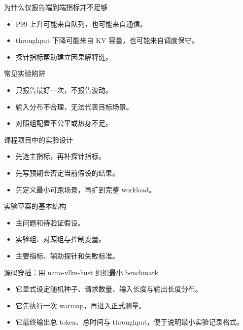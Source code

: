 \begin{frame}{为什么仅报告端到端指标并不足够}
  \begin{itemize}
    \item P99 上升可能来自队列，也可能来自通信。
    \item throughput 下降可能来自 KV 容量，也可能来自调度保守。
    \item 探针指标帮助建立因果解释链。
  \end{itemize}
\end{frame}

\begin{frame}{常见实验陷阱}
  \begin{itemize}
    \item 只报告最好一次，不报告波动。
    \item 输入分布不合理，无法代表目标场景。
    \item 对照组配置不公平或热身不足。
  \end{itemize}
\end{frame}

\begin{frame}{课程项目中的实验设计}
  \begin{itemize}
    \item 先选主指标，再补探针指标。
    \item 先写预期会否定当前假设的结果。
    \item 先定义最小可跑场景，再扩到完整 workload。
  \end{itemize}
\end{frame}

\begin{frame}{实验草案的基本结构}
  \begin{itemize}
    \item 主问题和待验证假设。
    \item 实验组、对照组与控制变量。
    \item 主要指标、辅助探针和失败标准。
  \end{itemize}
\end{frame}

\begin{frame}{源码穿插：用 nano-vllm-hust 组织最小 benchmark}
  \begin{itemize}
    \item 它显式设定随机种子、请求数量、输入长度与输出长度分布。
    \item 它先执行一次 warmup，再进入正式测量。
    \item 它最终输出总 token、总时间与 throughput，便于说明最小实验记录格式。
  \end{itemize}
\end{frame}

